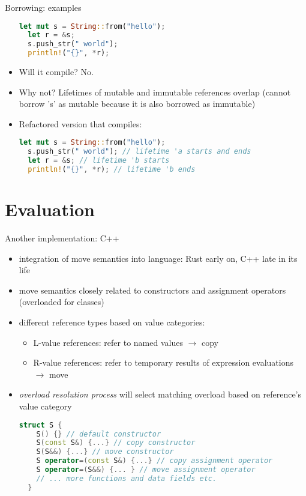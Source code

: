 \documentclass[handout]{beamer}
\begin{document}
\begin{frame}[fragile]{Borrowing: examples}
\begin{itemize}
  \begin{lstlisting}[language=Rust]
  let mut s = String::from("hello");
  let r = &s;
  s.push_str(" world");
  println!("{}", *r);
  \end{lstlisting}

  \item Will it compile? \pause No.
  \item Why not? \pause Lifetimes of mutable and immutable references overlap (cannot borrow 's' as mutable because it is also borrowed as immutable)
  \item Refactored version that compiles:\pause

  \begin{lstlisting}[language=Rust]
  let mut s = String::from("hello");
  s.push_str(" world"); // lifetime 'a starts and ends
  let r = &s; // lifetime 'b starts
  println!("{}", *r); // lifetime 'b ends
  \end{lstlisting}
\end{itemize}
\end{frame}


\section{Evaluation}

\begin{frame}[fragile]{Another implementation: C++}
\begin{itemize}
  \item integration of move semantics into language: Rust early on, C++ late in its life
  \item move semantics closely related to constructors and assignment operators (overloaded for classes)
  \item different reference types based on value categories:
  \begin{itemize}
    \item L-value references: refer to named values $\rightarrow$ copy
    \item R-value references: refer to temporary results of expression evaluations $\rightarrow$ move
  \end{itemize}
  \item \emph{overload resolution process} will select matching overload based on reference's value category
  \begin{lstlisting}[language=C++]
  struct S {
    S() {} // default constructor
    S(const S&) {...} // copy constructor
    S(S&&) {...} // move constructor
    S operator=(const S&) {...} // copy assignment operator
    S operator=(S&&) {... } // move assignment operator
    // ... more functions and data fields etc.
  }
  \end{lstlisting}
\end{itemize}
\end{frame}
\end{document}
